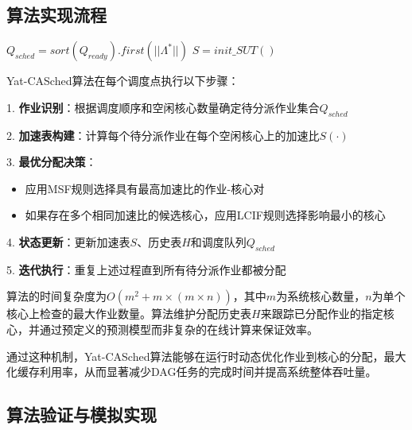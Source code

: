 \subsection{算法实现流程}

\begin{algorithm}[H]
\SetAlgoLined
\caption{Yat-CASched在线分配算法}
$Q_{sched} = sort(Q_{ready}).first(||\Lambda^*||)$\;
$S = init\_SUT()$\;
\end{algorithm}

Yat-CASched算法在每个调度点执行以下步骤：

1. \textbf{作业识别}：根据调度顺序和空闲核心数量确定待分派作业集合$Q_{sched}$

2. \textbf{加速表构建}：计算每个待分派作业在每个空闲核心上的加速比$S(\cdot)$

3. \textbf{最优分配决策}：
   \begin{itemize}
       \item 应用MSF规则选择具有最高加速比的作业-核心对
       \item 如果存在多个相同加速比的候选核心，应用LCIF规则选择影响最小的核心
   \end{itemize}

4. \textbf{状态更新}：更新加速表$S$、历史表$H$和调度队列$Q_{sched}$

5. \textbf{迭代执行}：重复上述过程直到所有待分派作业都被分配

算法的时间复杂度为$O(m^2 + m \times (m \times n))$，其中$m$为系统核心数量，$n$为单个核心上检查的最大作业数量。算法维护分配历史表$H$来跟踪已分配作业的指定核心，并通过预定义的预测模型而非复杂的在线计算来保证效率。

通过这种机制，Yat-CASched算法能够在运行时动态优化作业到核心的分配，最大化缓存利用率，从而显著减少DAG任务的完成时间并提高系统整体吞吐量。

\subsection{算法验证与模拟实现}

